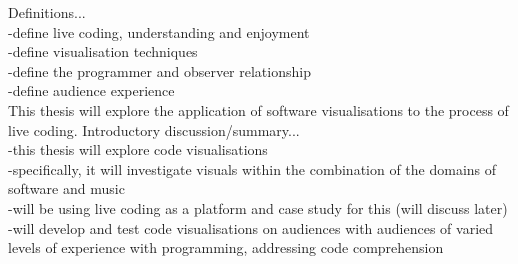 Definitions...\\
-define live coding, understanding and enjoyment\\
-define visualisation techniques\\
-define the programmer and observer relationship\\
-define audience experience\\

This thesis will explore the application of software visualisations to the process of live coding.
Introductory discussion/summary...\\
-this thesis will explore code visualisations\\
-specifically, it will investigate visuals within the combination of the domains of software and music\\
-will be using live coding as a platform and case study for this (will discuss later)\\
-will develop and test code visualisations on audiences with audiences of varied levels of experience with programming, addressing code comprehension\\







